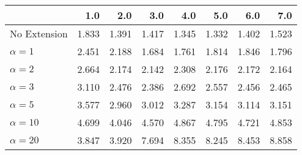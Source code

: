 \begin{tabular}{lrrrrrrr}
\toprule
{} &   1.0 &   2.0 &   3.0 &   4.0 &   5.0 &   6.0 &   7.0 \\
\midrule
No Extension  & 1.833 & 1.391 & 1.417 & 1.345 & 1.332 & 1.402 & 1.523 \\
$\alpha = 1$  & 2.451 & 2.188 & 1.684 & 1.761 & 1.814 & 1.846 & 1.796 \\
$\alpha = 2$  & 2.664 & 2.174 & 2.142 & 2.308 & 2.176 & 2.172 & 2.164 \\
$\alpha = 3$  & 3.110 & 2.476 & 2.386 & 2.692 & 2.557 & 2.456 & 2.465 \\
$\alpha = 5$  & 3.577 & 2.960 & 3.012 & 3.287 & 3.154 & 3.114 & 3.151 \\
$\alpha = 10$ & 4.699 & 4.046 & 4.570 & 4.867 & 4.795 & 4.721 & 4.853 \\
$\alpha = 20$ & 3.847 & 3.920 & 7.694 & 8.355 & 8.245 & 8.453 & 8.858 \\
\bottomrule
\end{tabular}
